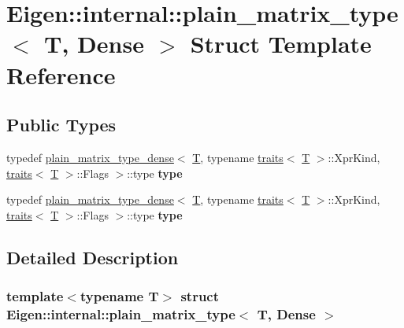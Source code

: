 \hypertarget{struct_eigen_1_1internal_1_1plain__matrix__type_3_01_t_00_01_dense_01_4}{}\section{Eigen\+:\+:internal\+:\+:plain\+\_\+matrix\+\_\+type$<$ T, Dense $>$ Struct Template Reference}
\label{struct_eigen_1_1internal_1_1plain__matrix__type_3_01_t_00_01_dense_01_4}
\subsection*{Public Types}
\begin{DoxyCompactItemize}
\item 
\mbox{\label{struct_eigen_1_1internal_1_1plain__matrix__type_3_01_t_00_01_dense_01_4_a0d64fab828a74bd90079074e27353145}} 
typedef \hyperlink{struct_eigen_1_1internal_1_1plain__matrix__type__dense}{plain\+\_\+matrix\+\_\+type\+\_\+dense}$<$ \hyperlink{group___sparse_core___module}{T}, typename \hyperlink{struct_eigen_1_1internal_1_1traits}{traits}$<$ \hyperlink{group___sparse_core___module}{T} $>$\+::Xpr\+Kind, \hyperlink{struct_eigen_1_1internal_1_1traits}{traits}$<$ \hyperlink{group___sparse_core___module}{T} $>$\+::Flags $>$\+::type {\bfseries type}
\item 
\mbox{\label{struct_eigen_1_1internal_1_1plain__matrix__type_3_01_t_00_01_dense_01_4_a0d64fab828a74bd90079074e27353145}} 
typedef \hyperlink{struct_eigen_1_1internal_1_1plain__matrix__type__dense}{plain\+\_\+matrix\+\_\+type\+\_\+dense}$<$ \hyperlink{group___sparse_core___module}{T}, typename \hyperlink{struct_eigen_1_1internal_1_1traits}{traits}$<$ \hyperlink{group___sparse_core___module}{T} $>$\+::Xpr\+Kind, \hyperlink{struct_eigen_1_1internal_1_1traits}{traits}$<$ \hyperlink{group___sparse_core___module}{T} $>$\+::Flags $>$\+::type {\bfseries type}
\end{DoxyCompactItemize}


\subsection{Detailed Description}
\subsubsection*{template$<$typename T$>$\newline
struct Eigen\+::internal\+::plain\+\_\+matrix\+\_\+type$<$ T, Dense $>$}



